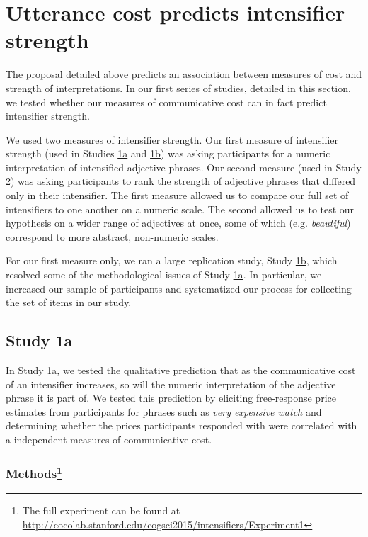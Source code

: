 \documentclass[10pt,letterpaper]{article}
\newcommand{\w}[1]{\emph{#1}}
\begin{document}
\section{Utterance cost predicts intensifier strength}

The proposal detailed above predicts an association between measures of cost and strength of interpretations.
In our first series of studies, detailed in this section, we tested whether our measures of communicative cost can in fact predict intensifier strength.

We used two measures of intensifier strength.
Our first measure of intensifier strength (used in Studies \hyperref[sec:study1a]{1a} and \hyperref[sec:study1b]{1b}) was asking participants for a numeric interpretation of intensified adjective phrases.
Our second measure (used in Study \hyperref[sec:study2]{2}) was asking participants to rank the strength of adjective phrases that differed only in their intensifier.
The first measure allowed us to compare our full set of intensifiers to one another on a numeric scale.
The second allowed us to test our hypothesis on a wider range of adjectives at once, some of which (e.g. \w{beautiful}) correspond to more abstract, non-numeric scales.

For our first measure only, we ran a large replication study, Study \hyperref[sec:study1b]{1b}, which resolved some of the methodological issues of Study \hyperref[sec:study1a]{1a}.
In particular, we increased our sample of participants and systematized our process for collecting the set of items in our study.

\subsection{Study 1a \label{sec:study1a}}

In Study \hyperref[sec:study1a]{1a}, we tested the qualitative prediction that as the communicative cost of an intensifier increases, so will the numeric interpretation of the adjective phrase it is part of.
We tested this prediction by eliciting free-response price estimates from participants for phrases such as \w{very expensive watch} and determining whether the prices participants responded with were correlated with a independent measures of communicative cost.

\subsubsection{Methods\footnote{The full experiment can be found at \url{http://cocolab.stanford.edu/cogsci2015/intensifiers/Experiment1}}}
\end{document}
